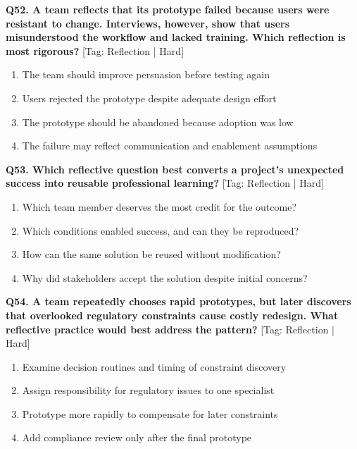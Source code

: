 \noindent\textbf{Q52. A team reflects that its prototype failed because users were resistant to change. Interviews, however, show that users misunderstood the workflow and lacked training. Which reflection is most rigorous?} \hfill [Tag: Reflection | Hard]
\begin{enumerate}[label=(\alph*),topsep=2pt,itemsep=1pt,partopsep=0pt,parsep=0pt]
    \item {The team should improve persuasion before testing again}
    \item {Users rejected the prototype despite adequate design effort}
    \item {The prototype should be abandoned because adoption was low}
    \item {The failure may reflect communication and enablement assumptions}
\end{enumerate}
\vspace{2mm}

\noindent\textbf{Q53. Which reflective question best converts a project's unexpected success into reusable professional learning?} \hfill [Tag: Reflection | Hard]
\begin{enumerate}[label=(\alph*),topsep=2pt,itemsep=1pt,partopsep=0pt,parsep=0pt]
    \item {Which team member deserves the most credit for the outcome?}
    \item {Which conditions enabled success, and can they be reproduced?}
    \item {How can the same solution be reused without modification?}
    \item {Why did stakeholders accept the solution despite initial concerns?}
\end{enumerate}
\vspace{2mm}

\noindent\textbf{Q54. A team repeatedly chooses rapid prototypes, but later discovers that overlooked regulatory constraints cause costly redesign. What reflective practice would best address the pattern?} \hfill [Tag: Reflection | Hard]
\begin{enumerate}[label=(\alph*),topsep=2pt,itemsep=1pt,partopsep=0pt,parsep=0pt]
    \item {Examine decision routines and timing of constraint discovery}
    \item {Assign responsibility for regulatory issues to one specialist}
    \item {Prototype more rapidly to compensate for later constraints}
    \item {Add compliance review only after the final prototype}
\end{enumerate}
\vspace{2mm}

